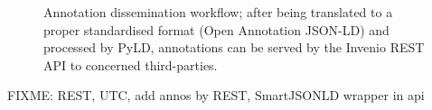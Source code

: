 
\begin{figure}[!ht]
  \centering
  \caption[Annotation dissemination workflow]
          {Annotation dissemination workflow; after being translated to a proper
           standardised format (Open Annotation JSON-LD) and processed by PyLD,
           annotations can be served by the Invenio REST API to concerned
           third-parties.}
  \label{fig:restanno}
\end{figure}

FIXME: REST, UTC, add annos by REST, SmartJSONLD wrapper in api
